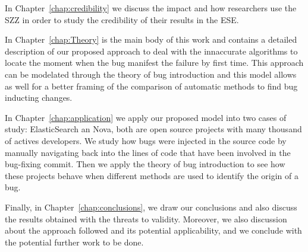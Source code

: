 \documentclass[a4paper, 12pt]{book}
\begin{document}
In Chapter~\ref{chap:credibility} we discuss the impact and how researchers use the SZZ in order to study the credibility of their results in the ESE.

In Chapter~\ref{chap:Theory} is the main body of this work and contains a detailed description of our proposed approach to deal with the innaccurate algorithms to locate the moment when the bug manifest the failure by first time. This approach can be modelated through the theory of bug introduction and this model allows as well for a better framing of the comparison of automatic methods to find bug inducting changes.

In Chapter~\ref{chap:application} we apply our proposed model into two cases of study: ElasticSearch an Nova, both are open source projects with many thousand of actives developers. We study how bugs were injected in the source code by manually navigating back into the lines of code that have been involved in the bug-fixing commit. Then we apply the theory of bug introduction to see how these projects behave when different methods are used to identify the origin of a bug. %

Finally, in Chapter~\ref{chap:conclusions}, we draw our conclusions and also discuss the results obtained with the threats to validity. Moreover, we also discussion about the approach followed and its potential applicability, and we conclude with the potential further work to be done.


\end{document}
